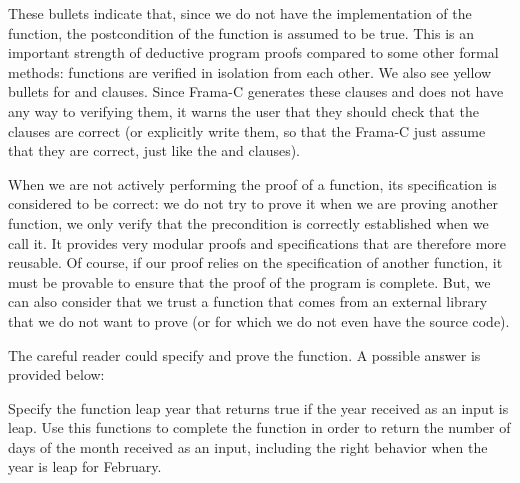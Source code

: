 

These bullets indicate that, since we do not have the implementation
of the function, the postcondition of the function is assumed to be
true. This is an important strength of deductive program proofs
compared to some other formal methods: functions are verified in
isolation from each other. We also see yellow bullets for 
and  clauses. Since Frama-C generates these clauses
and does not have any way to verifying them, it warns the user that they should
check that the clauses are correct (or explicitly write them, so that the
Frama-C just assume that they are correct, just like the 
and  clauses).

When we are not actively performing the proof of a function, its
specification is considered to be correct: we do not try to prove it
when we are proving another function, we only verify that the
precondition is correctly established when we call it. It provides very
modular proofs and specifications that are therefore more reusable. Of
course, if our proof relies on the specification of another function, it
must be provable to ensure that the proof of the program is complete.
But, we can also consider that we trust a function that comes from an
external library that we do not want to prove (or for which we do not
even have the source code).

The careful reader could specify and prove the 
function. A possible answer is provided below:








\label{l4:contract-modularity-ex-days-of-month}


Specify the function leap year that returns true if the year received
as an input is leap. Use this functions to complete the function
 in order to return the number of days of the
month received as an input, including the right behavior when the year
is leap for February.







\label{l4:contract-modularity-ex-alpha-num}


